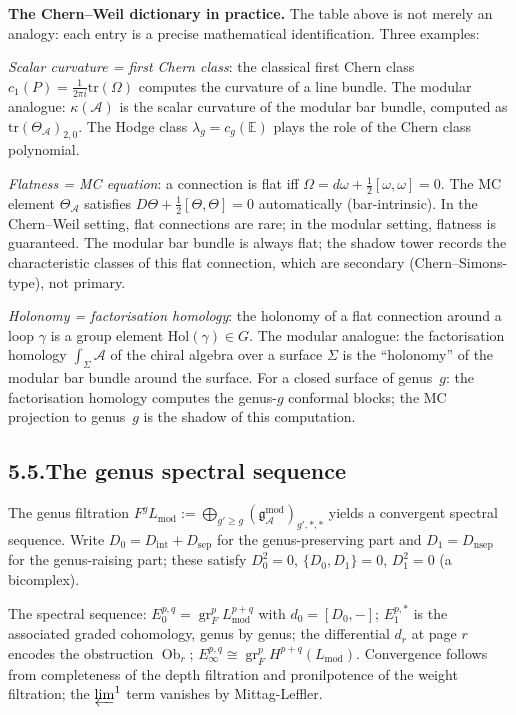 \documentclass[11pt,reqno]{amsart}
\theoremstyle{definition}
\theoremstyle{remark}
\providecommand{\cA}{\mathcal{A}}
\providecommand{\gAmod}{\mathfrak{g}^{\mathrm{mod}}_\cA}
\numberwithin{equation}{section}
\begin{document}
\medskip
\noindent\textbf{The Chern--Weil dictionary in practice.}\enspace
The table above is not merely an analogy: each entry is a precise
mathematical identification. Three examples:

\emph{Scalar curvature = first Chern class}: the classical first
Chern class $c_1(P)=\tfrac{1}{2\pi i}\mathrm{tr}(\Omega)$ computes
the curvature of a line bundle. The modular analogue: $\kappa(\cA)$
is the scalar curvature of the modular bar bundle, computed as
$\mathrm{tr}(\Theta_\cA)_{2,0}$. The Hodge class $\lambda_g=c_g(\mathbb E)$
plays the role of the Chern class polynomial.

\emph{Flatness = MC equation}: a connection is flat iff
$\Omega=d\omega+\tfrac12[\omega,\omega]=0$. The MC element
$\Theta_\cA$ satisfies $D\Theta+\tfrac12[\Theta,\Theta]=0$
automatically (bar-intrinsic). In the Chern--Weil setting, flat
connections are rare; in the modular setting, flatness is
guaranteed. The modular bar bundle is always flat; the shadow
tower records the characteristic classes of this flat connection,
which are secondary (Chern--Simons-type), not primary.

\emph{Holonomy = factorisation homology}: the holonomy of a flat
connection around a loop $\gamma$ is a group element
$\mathrm{Hol}(\gamma)\in G$. The modular analogue: the factorisation
homology $\int_\Sigma\cA$ of the chiral algebra over a surface
$\Sigma$ is the ``holonomy'' of the modular bar bundle around the
surface. For a closed surface of genus~$g$: the factorisation
homology computes the genus-$g$ conformal blocks; the MC projection
to genus~$g$ is the shadow of this computation.

\subsection*{5.5.\enspace The genus spectral sequence}

The genus filtration $F^g L_{\mathrm{mod}}:=\bigoplus_{g'\ge g}(\gAmod)_{g',*,*}$
yields a convergent spectral sequence. Write
$D_0=D_{\mathrm{int}}+D_{\mathrm{sep}}$ for the genus-preserving part
and $D_1=D_{\mathrm{nsep}}$ for the genus-raising part; these satisfy
$D_0^2=0$, $\{D_0,D_1\}=0$, $D_1^2=0$ (a bicomplex).

The spectral sequence: $E_0^{p,q}=\operatorname{gr}_F^p L_{\mathrm{mod}}^{p+q}$
with $d_0=[D_0,-]$; $E_1^{p,*}$ is the associated graded cohomology,
genus by genus; the differential $d_r$ at page $r$ encodes the
obstruction $\operatorname{Ob}_r$; $E_\infty^{p,q}\cong\operatorname{gr}_F^p H^{p+q}(L_{\mathrm{mod}})$.
Convergence follows from completeness of the depth filtration and
pronilpotence of the weight filtration; the $\varprojlim^1$ term
vanishes by Mittag-Leffler.
\end{document}
